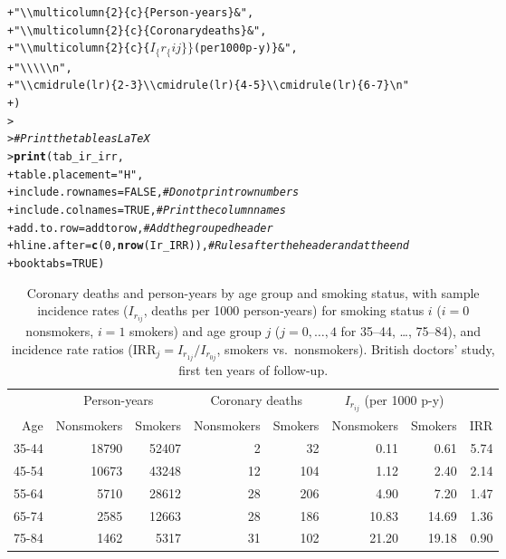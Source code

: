 \documentclass[a4paper,10pt]{article}\usepackage[]{graphicx}\usepackage[]{xcolor}
\makeatletter
\newcommand{\hlnum}[1]{\textcolor[rgb]{0.686,0.059,0.569}{#1}}%
\newcommand{\hlsng}[1]{\textcolor[rgb]{0.192,0.494,0.8}{#1}}%
\newcommand{\hlcom}[1]{\textcolor[rgb]{0.678,0.584,0.686}{\textit{#1}}}%
\newcommand{\hldef}[1]{\textcolor[rgb]{0.345,0.345,0.345}{#1}}%
\newcommand{\hlkwc}[1]{\textcolor[rgb]{0.333,0.667,0.333}{#1}}%
\newcommand{\hlkwd}[1]{\textcolor[rgb]{0.737,0.353,0.396}{\textbf{#1}}}%
\newenvironment{kframe}{%
 \def\at@end@of@kframe{}%
 \ifinner\ifhmode%
  \def\at@end@of@kframe{\end{minipage}}%
  \begin{minipage}{\columnwidth}%
 \fi\fi%
 \def\FrameCommand##1{\hskip\@totalleftmargin \hskip-\fboxsep
 \colorbox{shadecolor}{##1}\hskip-\fboxsep
     \hskip-\linewidth \hskip-\@totalleftmargin \hskip\columnwidth}%
 \MakeFramed {\advance\hsize-\width
   \@totalleftmargin\z@ \linewidth\hsize
   \@setminipage}}%
 {\par\unskip\endMakeFramed%
 \at@end@of@kframe}
\makeatother
\begin{document}
\begin{enumerate}
\begin{kframe}
\begin{alltt}
\hldef{+ }  \hlsng{"\textbackslash{}\textbackslash{}multicolumn\{2\}\{c\}\{Person-years\} & "}\hldef{,}
\hldef{+ }  \hlsng{"\textbackslash{}\textbackslash{}multicolumn\{2\}\{c\}\{Coronary deaths\} & "}\hldef{,}
\hldef{+ }  \hlsng{"\textbackslash{}\textbackslash{}multicolumn\{2\}\{c\}\{$I_\{r_\{ij\}\}$ (per 1000 p-y)\} &"}\hldef{,}
\hldef{+ }  \hlsng{"\textbackslash{}\textbackslash{}\textbackslash{}\textbackslash{}\textbackslash{}n"}\hldef{,}
\hldef{+ }  \hlsng{"\textbackslash{}\textbackslash{}cmidrule(lr)\{2-3\} \textbackslash{}\textbackslash{}cmidrule(lr)\{4-5\} \textbackslash{}\textbackslash{}cmidrule(lr)\{6-7\}\textbackslash{}n"}
\hldef{+ }\hldef{)}
\hldef{> }
\hldef{> }\hlcom{# Print the table as LaTeX}
\hldef{> }\hlkwd{print}\hldef{(tab_ir_irr,}
\hldef{+ }      \hlkwc{table.placement} \hldef{=} \hlsng{"H"}\hldef{,}
\hldef{+ }      \hlkwc{include.rownames} \hldef{=} \hlnum{FALSE}\hldef{,}         \hlcom{# Do not print row numbers}
\hldef{+ }      \hlkwc{include.colnames} \hldef{=} \hlnum{TRUE}\hldef{,}          \hlcom{# Print the column names}
\hldef{+ }      \hlkwc{add.to.row} \hldef{= addtorow,}            \hlcom{# Add the grouped header}
\hldef{+ }      \hlkwc{hline.after} \hldef{=} \hlkwd{c}\hldef{(}\hlnum{0}\hldef{,} \hlkwd{nrow}\hldef{(Ir_IRR)),} \hlcom{# Rules after the header and at the end}
\hldef{+ }      \hlkwc{booktabs} \hldef{=} \hlnum{TRUE}\hldef{)}
\end{alltt}
\end{kframe}%
\begin{table}[H]
\centering
\begin{tabular}{rrrrrrrr}
  \toprule
 &\multicolumn{2}{c}{Person-years} & \multicolumn{2}{c}{Coronary deaths} & \multicolumn{2}{c}{$I_{r_{ij}}$ (per 1000 p-y)} &\\
\cmidrule(lr){2-3} \cmidrule(lr){4-5} \cmidrule(lr){6-7}
Age & Nonsmokers & Smokers & Nonsmokers & Smokers & Nonsmokers & Smokers & IRR \\ 
  \midrule
35-44 & 18790 & 52407 & 2 & 32 & 0.11 & 0.61 & 5.74 \\ 
  45-54 & 10673 & 43248 & 12 & 104 & 1.12 & 2.40 & 2.14 \\ 
  55-64 & 5710 & 28612 & 28 & 206 & 4.90 & 7.20 & 1.47 \\ 
  65-74 & 2585 & 12663 & 28 & 186 & 10.83 & 14.69 & 1.36 \\ 
  75-84 & 1462 & 5317 & 31 & 102 & 21.20 & 19.18 & 0.90 \\ 
   \bottomrule
\end{tabular}
\caption{Coronary deaths and person-years by age group and smoking status, with sample incidence rates ($I_{r_{ij}}$, deaths per 1000 person-years) for smoking status $i$ ($i = 0$ nonsmokers, $i = 1$ smokers) and age group $j$ ($j = 0, \dots, 4$ for 35--44, \dots, 75--84), and incidence rate ratios ($\mathrm{IRR}_j = I_{r_{1j}}/I_{r_{0j}}$, smokers vs.\ nonsmokers). British doctors' study, first ten years of follow-up.} 
\label{tab:rates}
\end{table}





\end{enumerate}
\end{document}
